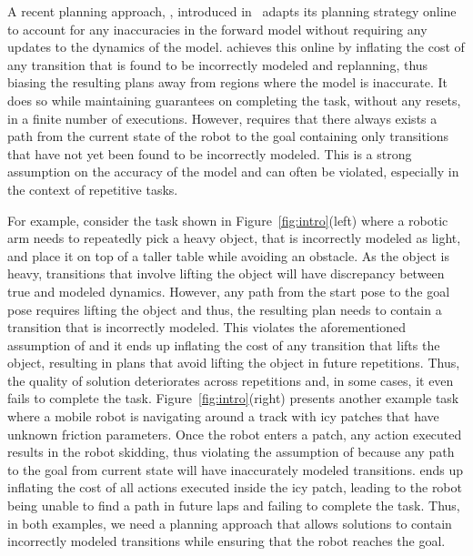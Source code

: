 A recent planning approach, \cmax{}, introduced
in~\cite{cmax} adapts its planning strategy online to account
for any inaccuracies in the forward model without requiring any
updates to the dynamics of the model. \cmax{} achieves this online by
inflating the cost of any transition that is found to be incorrectly
modeled and replanning, thus biasing the resulting plans away from
regions where the model is inaccurate. It does so while maintaining
guarantees on completing the task, without any resets, in a finite
number of executions. However, \cmax{} requires
that there always exists a path from the current state of the robot to the goal
containing only transitions that have not yet been found to be incorrectly
modeled. This is a strong assumption on the accuracy of the model and
can often be violated, especially in the context of repetitive tasks.

For example, consider the task shown in Figure~\ref{fig:intro}(left)
where a robotic arm needs to repeatedly pick a heavy object, that is
incorrectly modeled as light, and place it on top of a taller table while avoiding
an obstacle. As the object is heavy, transitions that involve lifting
the object will have discrepancy between true and modeled
dynamics. However, any path from the start pose to the goal pose
requires lifting the object and thus, the resulting plan needs to
contain a transition that is incorrectly modeled. This violates the
aforementioned assumption of \cmax{}
and it ends up
inflating the cost of any transition that lifts the object,
resulting in plans that avoid lifting the object in future
repetitions. Thus, the quality of \cmax{} solution deteriorates
across repetitions and, in some cases, it even fails to complete the
task. Figure~\ref{fig:intro}(right) presents another example task
where a mobile robot is navigating around a track with icy patches
that have unknown friction parameters. Once the robot enters a patch,
any action executed results in the robot skidding, thus violating the
assumption of \cmax{} because
any path to the goal from current state will have inaccurately modeled
transitions. \cmax{}
ends up inflating the cost of all actions executed inside the icy
patch, leading to the robot being unable to find a path in future laps and
failing to complete the task. Thus, in both examples, we need a
planning approach that allows solutions to contain incorrectly modeled
transitions while ensuring that the robot reaches the goal.


